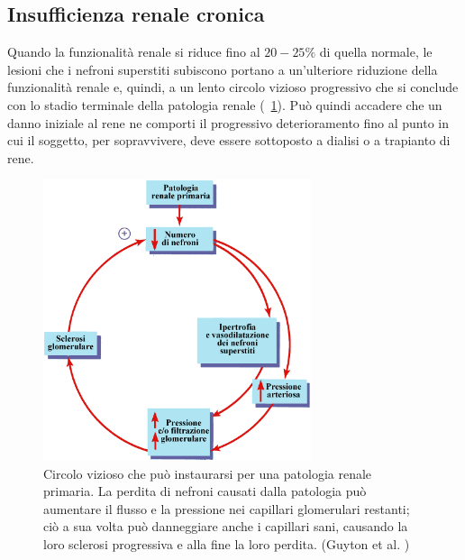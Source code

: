 \subsection{Insufficienza renale cronica \cite{guyton}}
Quando la funzionalità renale si riduce fino al $20-25\%$ di quella normale, le lesioni che i nefroni superstiti  subiscono portano a un'ulteriore riduzione della funzionalità renale e, quindi, a un lento circolo vizioso progressivo che si conclude con lo stadio terminale della patologia renale (\figurename~\ref{gfr}). Può quindi accadere che un danno iniziale al rene ne comporti il progressivo deterioramento fino al punto in cui il soggetto, per sopravvivere, deve essere sottoposto a dialisi o a trapianto di rene.
\begin{figure}[htb]
	\centering
		\includegraphics[width=0.7\textwidth]{immagini/gfr.eps}
		\caption{Circolo vizioso che può instaurarsi per una patologia renale primaria. La perdita di nefroni causati dalla patologia può aumentare il flusso e la pressione nei capillari glomerulari restanti; ciò a sua volta può danneggiare anche i capillari sani, causando la loro sclerosi progressiva e alla fine la loro perdita. (Guyton et al. \cite{guyton})}\label{gfr}
\end{figure}


